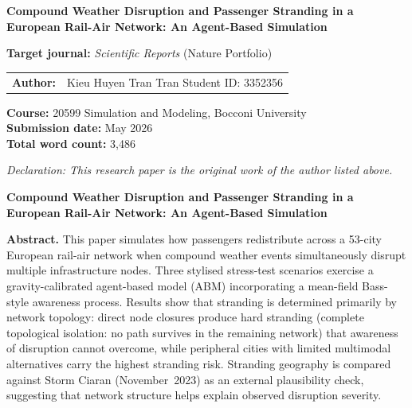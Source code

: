 \documentclass[12pt,a4paper]{article}
\begin{document}
\begin{titlepage}
\centering
\vspace*{1.5cm}

{\LARGE\bfseries Compound Weather Disruption and Passenger Stranding in a European Rail-Air Network: An Agent-Based Simulation}

\vspace{1.2cm}

\textbf{Target journal:} \textit{Scientific Reports} (Nature Portfolio)

\vspace{1.0cm}

\begin{tabular}{ll}
\textbf{Author:} & Kieu Huyen Tran Tran \quad Student ID: 3352356 \\
\end{tabular}

\vspace{1.0cm}

\textbf{Course:} 20599 Simulation and Modeling, Bocconi University\\[4pt]
\textbf{Submission date:} May 2026\\[4pt]
\textbf{Total word count:} 3,486\\[4pt]

\vspace{1.2cm}

\textit{Declaration: This research paper is the original work of the author listed above.}

\end{titlepage}

\setcounter{page}{1}

\begin{center}
{\large\bfseries Compound Weather Disruption and Passenger Stranding in a European Rail-Air Network: An Agent-Based Simulation}
\end{center}

\vspace{0.3em}

\noindent\textbf{Abstract.}
This paper simulates how passengers redistribute across a 53-city European rail-air network when
compound weather events simultaneously disrupt multiple infrastructure nodes.
Three stylised stress-test scenarios exercise a gravity-calibrated agent-based model (ABM)
incorporating a mean-field Bass-style awareness process.
Results show that stranding is determined primarily by network topology:
direct node closures produce hard stranding (complete topological isolation: no path survives in the remaining network) that awareness of disruption cannot overcome,
while peripheral cities with limited multimodal alternatives carry the highest stranding risk.
Stranding geography is compared against Storm Ciaran (November~2023) as an external
plausibility check, suggesting that network structure helps explain observed disruption severity.
\end{document}
